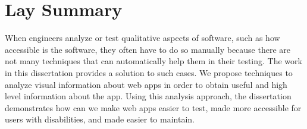 

\chapter{Lay Summary}

  
When engineers analyze or test qualitative aspects of software, such as how 
accessible is the software, they often have to do so manually because there 
are not many techniques that can automatically help them in their testing.  
The work in this dissertation provides a solution to such cases. 
We propose techniques to analyze visual information about web apps in order 
to obtain useful and high level information about the app. 
Using this analysis approach, the dissertation demonstrates how can we make web apps  
easier to test, made more accessible for users with disabilities, and made easier 
to maintain.  

 